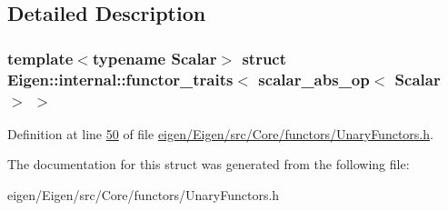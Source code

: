 \subsection{Detailed Description}
\subsubsection*{template$<$typename Scalar$>$\newline
struct Eigen\+::internal\+::functor\+\_\+traits$<$ scalar\+\_\+abs\+\_\+op$<$ Scalar $>$ $>$}



Definition at line \hyperlink{eigen_2_eigen_2src_2_core_2functors_2_unary_functors_8h_source_l00050}{50} of file \hyperlink{eigen_2_eigen_2src_2_core_2functors_2_unary_functors_8h_source}{eigen/\+Eigen/src/\+Core/functors/\+Unary\+Functors.\+h}.



The documentation for this struct was generated from the following file\+:\begin{DoxyCompactItemize}
\item 
eigen/\+Eigen/src/\+Core/functors/\+Unary\+Functors.\+h\end{DoxyCompactItemize}
